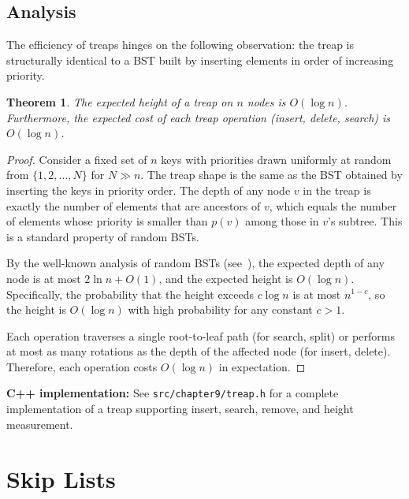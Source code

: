 \documentclass[twoside,12pt]{book}
\theoremstyle{plain}
\newtheorem{theorem}{Theorem}[chapter]
\theoremstyle{definition}
\theoremstyle{remark}
\newenvironment{cpplisting}{\begin{center}\small}{\end{center}}
\begin{document}
\subsection{Analysis}

The efficiency of treaps hinges on the following observation: the treap is structurally identical to a BST built by inserting elements in order of increasing priority.

\begin{theorem}\label{thm:treap}
The expected height of a treap on $n$ nodes is $O(\log n)$. Furthermore, the expected cost of each treap operation (insert, delete, search) is $O(\log n)$.
\end{theorem}

\begin{proof}
Consider a fixed set of $n$ keys with priorities drawn uniformly at random from $\{1, 2, \ldots, N\}$ for $N \gg n$. The treap shape is the same as the BST obtained by inserting the keys in priority order. The depth of any node $v$ in the treap is exactly the number of elements that are ancestors of $v$, which equals the number of elements whose priority is smaller than $p(v)$ among those in $v$'s subtree. This is a standard property of random BSTs.

By the well-known analysis of random BSTs (see~\cite{devroye1988}), the expected depth of any node is at most $2 \ln n + O(1)$, and the expected height is $O(\log n)$. Specifically, the probability that the height exceeds $c \log n$ is at most $n^{1-c}$, so the height is $O(\log n)$ with high probability for any constant $c > 1$.

Each operation traverses a single root-to-leaf path (for search, split) or performs at most as many rotations as the depth of the affected node (for insert, delete). Therefore, each operation costs $O(\log n)$ in expectation.
\end{proof}

\begin{cpplisting}
\textbf{C++ implementation:} See \texttt{src/chapter9/treap.h} for a complete implementation
of a treap supporting insert, search, remove, and height measurement.
\end{cpplisting}

\section{Skip Lists}
\label{sec:skip-lists}
\end{document}
